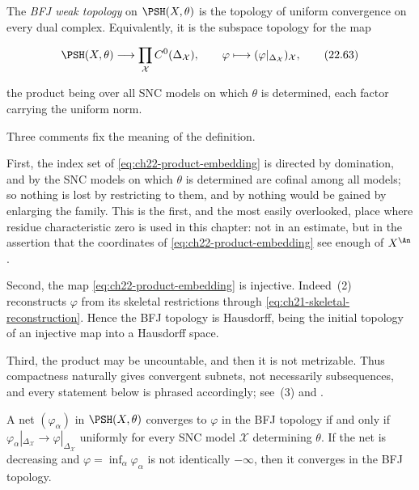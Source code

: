 \begin{definition}\label{def:ch22-bfj-topology}
The \emph{BFJ weak topology} on $\PSH(X,\theta)$ is the topology of uniform
convergence on every dual complex.  Equivalently, it is the subspace
topology for the map

\[
 \PSH(X,\theta)\longrightarrow
 \prod_{\mathcal X}C^0(\Delta_{\mathcal X}),
 \qquad
 \varphi\longmapsto
       (\varphi|_{\Delta_{\mathcal X}})_{\mathcal X},
\tag{22.63}\label{eq:ch22-product-embedding}
\]

the product being over all SNC models on which $\theta$ is determined,
each factor carrying the uniform norm.
\end{definition}

Three comments fix the meaning of the definition.

First, the index set of \eqref{eq:ch22-product-embedding} is directed by
domination, and by  the SNC models on which
$\theta$ is determined are cofinal among all models; so nothing is lost by
restricting to them, and by  nothing
would be gained by enlarging the family.  This is the first, and the most
easily overlooked, place where residue characteristic zero is used in this
chapter: not in an estimate, but in the assertion that the coordinates of
\eqref{eq:ch22-product-embedding} see enough of $X^{\An}$.

Second, the map \eqref{eq:ch22-product-embedding} is injective.  Indeed
\,(2) reconstructs $\varphi$ from
its skeletal restrictions through
\eqref{eq:ch21-skeletal-reconstruction}.  Hence the BFJ topology is
Hausdorff, being the initial topology of an injective map into a Hausdorff
space.

Third, the product may be uncountable, and then it is not metrizable.  Thus
compactness naturally gives convergent subnets, not necessarily
subsequences, and every statement below is phrased accordingly; see
\,(3) and .

\begin{lemma}
\label{lem:ch22-convergence-criterion}
A net $(\varphi_\alpha)$ in $\PSH(X,\theta)$ converges to $\varphi$ in
the BFJ topology if and only if
$\varphi_\alpha|_{\Delta_{\mathcal X}}\to\varphi|_{\Delta_{\mathcal X}}$
uniformly for every SNC model $\mathcal X$ determining $\theta$.  If the
net is decreasing and $\varphi=\inf_\alpha\varphi_\alpha$ is not
identically $-\infty$, then it converges in the BFJ topology.
\end{lemma}

